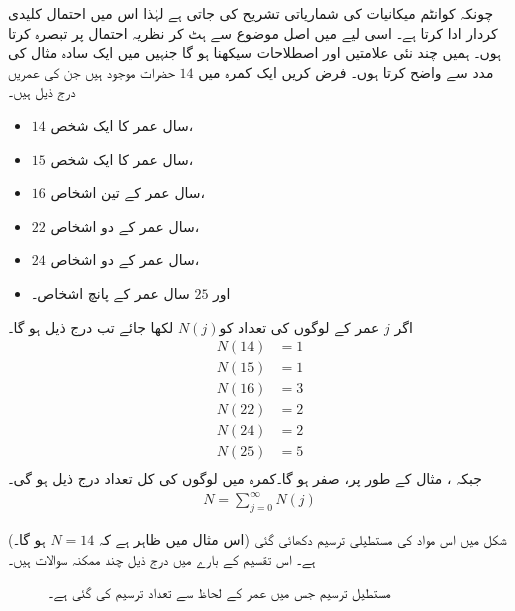 چونکہ کوانٹم میکانیات کی شماریاتی تشریح کی جاتی ہے  لہٰذا  اس میں احتمال کلیدی کردار ادا کرتا ہے۔ اسی لیے میں اصل موضوع سے ہٹ کر  نظریہ احتمال پر تبصرہ کرتا ہوں۔ ہمیں چند نئی علامتیں  اور اصطلاحات سیکھنا ہو گا جنہیں میں ایک سادہ مثال کی مدد سے  واضح کرتا ہوں۔ 
فرض کریں ایک کمرہ   میں  \( 14 \)  حضرات موجود ہیں جن  کی  عمریں درج ذیل ہیں۔ 
\begin{itemize}
\item
 \( 14 \) سال عمر کا ایک شخص، 
\item
 \( 15 \) سال عمر کا ایک شخص، 
\item
 \( 16 \) سال عمر کے تین اشخاص، 
\item
 \( 22 \) سال عمر کے دو اشخاص، 
\item
 \( 24 \) سال عمر کے دو اشخاص، 
\item
 اور  \( 25 \) سال عمر کے پانچ  اشخاص۔
\end{itemize} 
اگر  \( j \)  عمر  کے لوگوں کی  تعداد  کو\( N(j) \) لکھا جائے تب درج ذیل ہو گا۔
\begin{align*}
N(14) &= 1 \\
N(15) &= 1 \\
N(16) &= 3 \\
N(22) &= 2 \\
N(24) &= 2 \\
N(25) &= 5 \\
\end{align*}
جبکہ ، مثال کے طور پر، صفر ہو گا۔کمرہ میں لوگوں کی کل تعداد درج ذیل ہو گی۔ 
\begin{align}
N = \sum_{j=0}^{\infty} N(j)
\end{align}

(اس مثال میں ظاہر ہے کہ \( N=14 \) ہو گا۔)  شکل   میں اس مواد کی مستطیلی ترسیم دکھائی  گئی ہے۔ اس تقسیم کے بارے میں  درج ذیل چند ممکنہ سوالات ہیں۔ 

\begin{figure}
\centering
{}
\caption{مستطیل ترسیم جس میں عمر  کے لحاظ سے تعداد  ترسیم کی گئی ہے۔}
\label{شکل_تفاعل_موج_عمر_مستطیل_ترسیم}
\end{figure}

